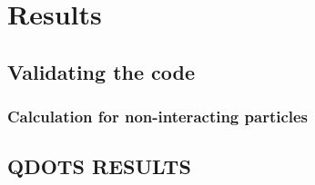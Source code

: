 \chapter{Results}


\section{Validating the code}


\subsection{Calculation for non-interacting particles}

\section{QDOTS RESULTS}

